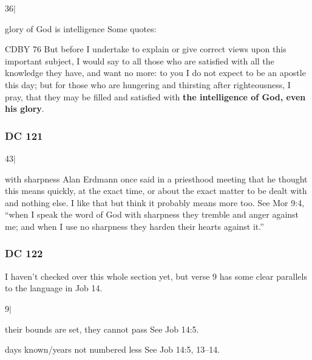 \begin{compactdesc}
		\item[36$\vert$]
		\begin{compactdesc}
		\item[glory of God is intelligence] Some quotes:
			\begin{compactdesc}
			\item[CDBY 76] But before I undertake to explain or give correct views upon this important subject, I would say to all those who are satisfied with all the knowledge they have, and want no more: to you I do not expect to be an apostle this day; but for those who are hungering and thirsting after righteousness, I pray, that they may be filled and satisfied with \textbf{the intelligence of God, even his glory}.
			\end{compactdesc}
		\end{compactdesc}
		
		\end{compactdesc}
		
	\subsubsection{DC 121} %
	
		\begin{compactdesc}
		
		\item[43$\vert$]
		\begin{compactdesc}
		\item[with sharpness] Alan Erdmann once said in a priesthood meeting that he thought this means quickly, at the exact time, or about the exact matter to be dealt with and nothing else. I like that but think it probably means more too. See Mor 9:4, ``when I speak the word of God with sharpness they tremble and anger against me; and when I use no sharpness they harden their hearts against it.''
		\end{compactdesc}
		
		\end{compactdesc}
		
	\subsubsection{DC 122} %
	
		I haven't checked over this whole section yet, but verse 9 has some clear parallels to the language in Job 14.
		
		\begin{compactdesc}
	
		\item[9$\vert$]
		\begin{compactdesc}
		\item[their bounds are set, they cannot pass] See Job 14:5.
		\item[days known/years not numbered less] See Job 14:5, 13--14.
		\end{compactdesc}
		
		\end{compactdesc}
		
